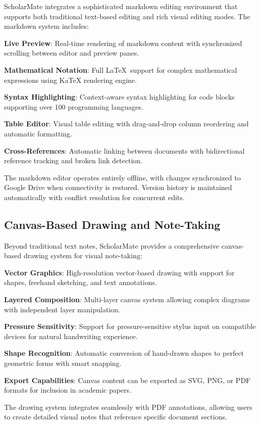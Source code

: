 \documentclass[conference]{IEEEtran}
\begin{document}
ScholarMate integrates a sophisticated markdown editing environment that supports both traditional text-based editing and rich visual editing modes. The markdown system includes:

\textbf{Live Preview}: Real-time rendering of markdown content with synchronized scrolling between editor and preview panes.

\textbf{Mathematical Notation}: Full \LaTeX\ support for complex mathematical expressions using KaTeX rendering engine.

\textbf{Syntax Highlighting}: Context-aware syntax highlighting for code blocks supporting over 100 programming languages.

\textbf{Table Editor}: Visual table editing with drag-and-drop column reordering and automatic formatting.

\textbf{Cross-References}: Automatic linking between documents with bidirectional reference tracking and broken link detection.

The markdown editor operates entirely offline, with changes synchronized to Google Drive when connectivity is restored. Version history is maintained automatically with conflict resolution for concurrent edits.

\subsection{Canvas-Based Drawing and Note-Taking}

Beyond traditional text notes, ScholarMate provides a comprehensive canvas-based drawing system for visual note-taking:

\textbf{Vector Graphics}: High-resolution vector-based drawing with support for shapes, freehand sketching, and text annotations.

\textbf{Layered Composition}: Multi-layer canvas system allowing complex diagrams with independent layer manipulation.

\textbf{Pressure Sensitivity}: Support for pressure-sensitive stylus input on compatible devices for natural handwriting experience.

\textbf{Shape Recognition}: Automatic conversion of hand-drawn shapes to perfect geometric forms with smart snapping.

\textbf{Export Capabilities}: Canvas content can be exported as SVG, PNG, or PDF formats for inclusion in academic papers.

The drawing system integrates seamlessly with PDF annotations, allowing users to create detailed visual notes that reference specific document sections.
\end{document}
